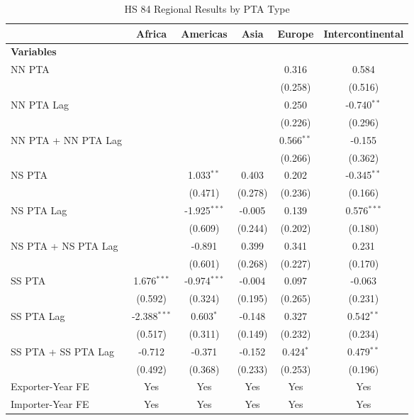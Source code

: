 \begin{table}[htbp]
    \centering
    \caption{HS 84 Regional Results by PTA Type}
    \label{tab:84_pta_types}
    \begin{adjustbox}{max width=\textwidth}
    \begin{tabular}{lccccc}
    \hline
     & \multicolumn{1}{c}{Africa} & \multicolumn{1}{c}{Americas} & \multicolumn{1}{c}{Asia} & \multicolumn{1}{c}{Europe} & \multicolumn{1}{c}{Intercontinental} \\
    \hline
    \textbf{Variables} &  &  &  &  &  \\
    \hline
    NN PTA &  &  &  & 0.316 & 0.584 \\
     &  &  &  & (0.258) & (0.516) \\
    NN PTA Lag &  &  &  & 0.250 & -0.740$^{\ast\ast}$ \\
     &  &  &  & (0.226) & (0.296) \\
    NN PTA + NN PTA Lag &  &  &  & 0.566$^{\ast\ast}$ & -0.155 \\
     &  &  &  & (0.266) & (0.362) \\
    \hline
    NS PTA &  & 1.033$^{\ast\ast}$ & 0.403 & 0.202 & -0.345$^{\ast\ast}$ \\
     &  & (0.471) & (0.278) & (0.236) & (0.166) \\
    NS PTA Lag &  & -1.925$^{\ast\ast\ast}$ & -0.005 & 0.139 & 0.576$^{\ast\ast\ast}$ \\
     &  & (0.609) & (0.244) & (0.202) & (0.180) \\
    NS PTA + NS PTA Lag &  & -0.891 & 0.399 & 0.341 & 0.231 \\
     &  & (0.601) & (0.268) & (0.227) & (0.170) \\
    \hline
    SS PTA & 1.676$^{\ast\ast\ast}$ & -0.974$^{\ast\ast\ast}$ & -0.004 & 0.097 & -0.063 \\
     & (0.592) & (0.324) & (0.195) & (0.265) & (0.231) \\
    SS PTA Lag & -2.388$^{\ast\ast\ast}$ & 0.603$^{\ast}$ & -0.148 & 0.327 & 0.542$^{\ast\ast}$ \\
     & (0.517) & (0.311) & (0.149) & (0.232) & (0.234) \\
    SS PTA + SS PTA Lag & -0.712 & -0.371 & -0.152 & 0.424$^{\ast}$ & 0.479$^{\ast\ast}$ \\
     & (0.492) & (0.368) & (0.233) & (0.253) & (0.196) \\
    \hline
    Exporter-Year FE & Yes & Yes & Yes & Yes & Yes \\
    Importer-Year FE & Yes & Yes & Yes & Yes & Yes \\

\end{tabular}
\end{adjustbox}
\end{table}

